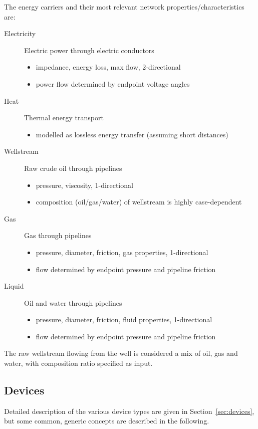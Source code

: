 \documentclass[12pt]{article}
\begin{document}
The energy carriers and their most relevant network properties/characteristics are:
\begin{description}
	\item[Electricity] Electric power through electric conductors
	\begin{itemize}
		\item impedance, energy loss, max flow, 2-directional
		\item power flow determined by endpoint voltage angles
	\end{itemize}
	\item[Heat] Thermal energy transport
	\begin{itemize}
		\item modelled as lossless energy transfer (assuming short distances)
	\end{itemize}
	\item[Wellstream] Raw crude oil through pipelines
	\begin{itemize}
		\item pressure, viscosity, 1-directional
		\item composition (oil/gas/water) of wellstream is highly case-dependent
	\end{itemize}
	\item[Gas] Gas through pipelines
	\begin{itemize}
		\item pressure, diameter, friction, gas properties, 1-directional
		\item flow determined by endpoint pressure and pipeline friction
	\end{itemize}
	\item[Liquid] Oil and water through pipelines
	\begin{itemize}
		\item pressure, diameter, friction, fluid properties, 1-directional
		\item flow determined by endpoint pressure and pipeline friction
	\end{itemize}
\end{description}
The raw wellstream flowing from the well is considered a mix of oil, gas and water, with composition ratio specified as input.



\subsection{Devices}

Detailed description of the various device types are given in Section~\ref{sec:devices}, but some common, generic concepts are described in the following.
\end{document}
